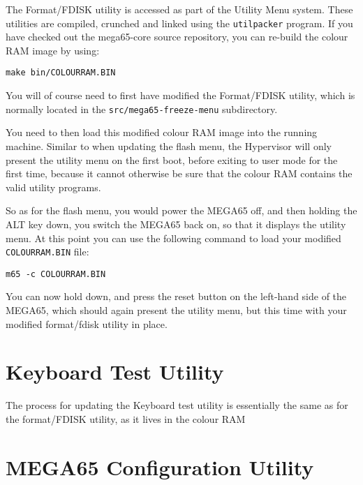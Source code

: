 The Format/FDISK utility is accessed as part of the Utility Menu system.  These utilities are compiled, crunched and linked using the
{\tt utilpacker} program.  If you have checked out the mega65-core source repository, you can re-build the colour RAM image by using:

\begin{tcolorbox}[colback=black,coltext=white]
\verbatimfont{\codefont}
\begin{verbatim}
make bin/COLOURRAM.BIN
\end{verbatim}
\end{tcolorbox}

You will of course need to first have modified the Format/FDISK utility, which is normally located in the {\tt src/mega65-freeze-menu} subdirectory.

You need to then load this modified colour RAM image into the running machine. Similar to when updating the flash menu, the Hypervisor will
only present the utility menu on the first boot, before exiting to user mode for the first time, because it cannot otherwise be sure that
the colour RAM contains the valid utility programs.  

So as for the flash menu, you would power the MEGA65 off, and then holding the ALT key down, you switch the MEGA65 back on, so that it displays the utility menu.  At this point you can use the following command to load your modified {\tt COLOURRAM.BIN} file:

\begin{tcolorbox}[colback=black,coltext=white]
\verbatimfont{\codefont}
\begin{verbatim}
m65 -c COLOURRAM.BIN
\end{verbatim}
\end{tcolorbox}

You can now hold  down, and press the reset button on the left-hand side of the MEGA65, which should
again present
the utility menu,
but this time with your modified format/fdisk utility in place.

\section{Keyboard Test Utility}

The process for updating the Keyboard test utility is essentially the same as for the format/FDISK utility, as it lives in the colour RAM

\section{MEGA65 Configuration Utility}

